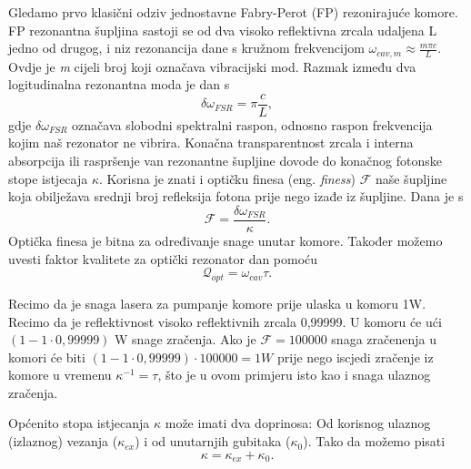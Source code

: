
Gledamo prvo klasični odziv jednostavne Fabry-Perot (FP) rezonirajuće komore. FP rezonantna šupljina sastoji se od dva visoko reflektivna
zrcala udaljena L jedno od drugog, i niz rezonancija dane s kružnom frekvencijom $\omega_{cav,m} \approx \frac{m\pi c}{L}$. Ovdje je \textit{m} cijeli broj koji označava
vibracijski mod. Razmak između dva logitudinalna rezonantna moda je dan s
\begin{equation}
	\delta\omega_{FSR} = \pi \frac{c}{L},
\end{equation}
gdje $\delta \omega_{FSR}$ označava slobodni spektralni raspon, odnosno raspon frekvencija kojim naš rezonator ne vibrira. Konačna transparentnost zrcala i
interna absorpcija ili raspršenje van rezonantne šupljine dovode do konačnog fotonske stope istjecaja $\kappa$.
Korisna je znati i optičku finesa (eng. \textit{finess}) $\mathcal{F}$ naše šupljine koja obilježava srednji broj refleksija fotona prije nego izađe iz šupljine. Dana je s
\begin{equation}
	\mathcal{F} = \frac{\delta\omega_{FSR}}{\kappa}.
\end{equation}
Optička finesa je bitna za određivanje snage unutar komore. Također možemo uvesti faktor kvalitete za optički rezonator dan pomoću
\begin{equation}
	\mathcal{Q}_{opt} = \omega_{cav} \tau.
\end{equation}
\begin{Bilješka}
Recimo da je snaga lasera za pumpanje komore prije ulaska u komoru 1W. Recimo da je reflektivnost visoko reflektivnih zrcala 0,99999.
U komoru će ući $\left(1-1\cdot0,99999\right)$ W snage zračenja. Ako je $\mathcal{F}=100000$ snaga zračenenja u komori će biti
$\left(1-1\cdot0,99999\right)\cdot 100000 = 1W$ prije nego iscjedi zračenje iz komore u vremenu $\kappa^{-1} = \tau$, što je u ovom primjeru isto kao i snaga ulaznog zračenja.
\end{Bilješka}
Općenito stopa istjecanja $\kappa$ može imati dva doprinosa: Od korisnog ulaznog (izlaznog) vezanja ($\kappa_{ex}$) i od unutarnjih gubitaka ($\kappa_0$). Tako da možemo pisati
\begin{equation}
	\kappa = \kappa_{ex} + \kappa_0.
\end{equation}


